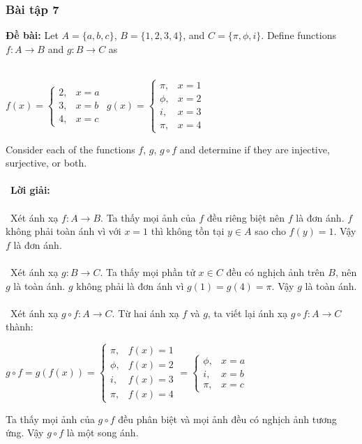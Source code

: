 \documentclass[a4paper]{article}
\begin{document}
\subsubsection{Bài tập 7}
\textbf{Đề bài:} Let $A = \{a, b, c\}$, $B = \{1, 2, 3, 4\}$, and $C = \{\pi, \phi, i\}$. Define functions $f : A \rightarrow B$ and $g : B \rightarrow C$ as \\\
\begin{center}
$f(x) = \begin{cases} 2, & x=a \\ 3, & x = b \\ 4, & x=c \end{cases}$ \hspace{0.5cm}
$g(x) = \begin{cases} \pi, & x=1 \\ \phi, & x = 2 \\ i, & x=3 \\ \pi, & x=4 \end{cases}$
\end{center}
Consider each of the functions $f$, $g$, $g\circ f$ and determine if they are injective, surjective, or both. \\\ \\\
\textbf{Lời giải:} \\\ \\\
Xét ánh xạ $f : A \rightarrow B$. Ta thấy mọi ảnh của $f$ đều riêng biệt nên $f$ là đơn ánh. $f$ không phải toàn ánh vì với $x = 1$ thì không tồn tại $y \in A$ sao cho $f(y) = 1$. Vậy $f$ là đơn ánh. \\\ \\\
Xét ánh xạ $g : B \rightarrow C$. Ta thấy mọi phần tử $x \in C$ đều có nghịch ảnh trên $B$, nên $g$ là toàn ánh. $g$ không phải là đơn ánh vì $g(1) = g(4) = \pi$. Vậy $g$ là toàn ánh. \\\ \\\
Xét ánh xạ $g\circ f : A \rightarrow C$.
Từ hai ánh xạ $f$ và $g$, ta viết lại ánh xạ $g\circ f : A \rightarrow C$ thành: 
\begin{center}
$g\circ f = g(f(x)) = \begin{cases} \pi, & f(x)=1 \\ \phi, & f(x) = 2 \\ i, & f(x)=3 \\ \pi, & f(x)=4 \end{cases} = \begin{cases} \phi, & x = a \\ i, & x=b \\ \pi, & x=c \end{cases}$
\end{center}
Ta thấy mọi ảnh của $g \circ f$ đều phân biệt và mọi ảnh đều có nghịch ảnh tương ứng. Vậy $g \circ f$ là một song ánh.
\clearpage
\end{document}
